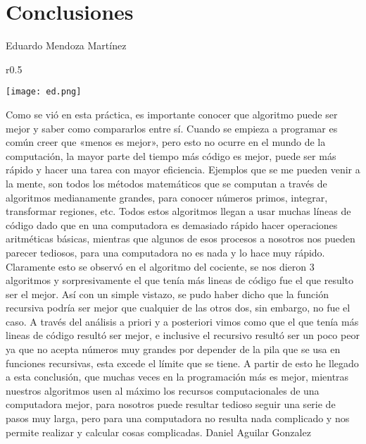 \documentclass[12pt,twoside]{article}
\begin{document}
\section{Conclusiones}
Eduardo Mendoza Martínez\newline
\begin{wrapfigure}{r}{0.5\textwidth}
  \begin{center}
    \texttt{[image: ed.png]}
  \end{center}

\end{wrapfigure}
Como se vió en esta práctica, es importante conocer que algoritmo puede ser mejor y saber como compararlos entre sí. Cuando se empieza a programar es común creer que «menos es mejor», pero esto no ocurre en el mundo de la computación, la mayor parte del tiempo más código es mejor, puede ser más rápido y hacer una tarea con mayor eficiencia. Ejemplos que se me pueden venir a la mente, son todos los métodos matemáticos que se computan a través de algoritmos medianamente grandes, para conocer números primos, integrar, transformar regiones, etc. Todos estos algoritmos llegan a usar muchas líneas de código dado que en una computadora es demasiado rápido hacer operaciones aritméticas básicas, mientras que algunos de esos procesos a nosotros nos pueden parecer tediosos, para una computadora no es nada y lo hace muy rápido. Claramente esto se observó en el algoritmo del cociente, se nos dieron 3 algoritmos y sorpresivamente el que tenía más lineas de código fue el que resulto ser el mejor. Así con un simple vistazo, se pudo haber dicho que la función recursiva podría ser mejor que cualquier de las otros dos, sin embargo, no fue el caso. A través del análisis a priori y a posteriori vimos como que el que tenía más lineas de código resultó ser mejor, e inclusive el recursivo resultó ser un poco peor ya que no acepta números muy grandes por depender de la pila que se usa en funciones recursivas, esta excede el límite que se tiene. A partir de esto he llegado a esta conclusión, que muchas veces en la programación más es mejor, mientras nuestros algoritmos usen al máximo los recursos computacionales de una computadora mejor, para nosotros puede resultar tedioso seguir una serie de pasos muy larga, pero para una computadora no resulta nada complicado y nos permite realizar y calcular cosas complicadas.
\newline \newline \newline \newline
Daniel Aguilar Gonzalez\newline
\end{document}
